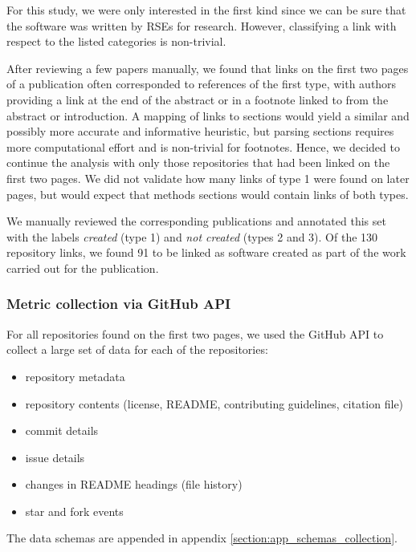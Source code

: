 \documentclass[10pt,a4paper]{scrartcl}
\begin{document}
For this study, we were only interested in the first kind since we can be sure that the software was written by RSEs for research.
However, classifying a link with respect to the listed categories is non-trivial.

After reviewing a few papers manually, we found that links on the first two pages of a publication often corresponded to references of the first type,
with authors providing a link at the end of the abstract or in a footnote linked to from the abstract or introduction.
A mapping of links to sections would yield a similar and possibly more accurate and informative heuristic,
but parsing sections requires more computational effort and is non-trivial for footnotes.
Hence, we decided to continue the analysis with only those repositories that had been linked on the first two pages.
We did not validate how many links of type 1 were found on later pages,
but would expect that methods sections would contain links of both types.

We manually reviewed the corresponding publications and annotated this set with the labels \textit{created} (type 1) and \textit{not created} (types 2 and 3).
Of the 130 repository links, we found 91 to be linked as software created as part of the work carried out for the publication.

\subsubsection*{Metric collection via GitHub API}

For all repositories found on the first two pages, we used the GitHub API to collect a large set of data for each of the repositories:

\begin{itemize}
    \item repository metadata
    \item repository contents (license, README, contributing guidelines, citation file)
    \item commit details
    \item issue details
    \item changes in README headings (file history)
    \item star and fork events
\end{itemize}

The data schemas are appended in appendix \ref{section:app_schemas_collection}.
\end{document}
